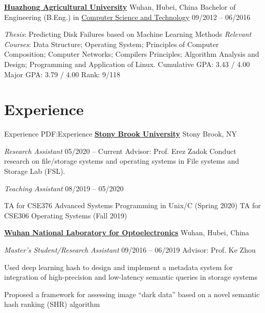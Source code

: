 \documentclass[letterpaper,10pt,oneside]{article}
\begin{document}
\begin{body}
\BigGap
\href{http://www.hzau.edu.cn/en/HOME.htm}
{\textbf{Huazhong Agricultural University}}
\hfill
Wuhan, Hubei, China
\GapNoBreak
\BulletItem
Bachelor of Engineering (B.Eng.) in
\href{http://coi.hzau.edu.cn/}
{Computer Science and Technology}
\hfill
09/2012 -- 06/2016
\begin{detail}

\SubBulletItem
\emph{Thesis}: Predicting Disk Failures based on Machine Learning Methods
\SubBulletItem
\emph{Relevant Courses}: Data Structure; Operating System; Principles of Computer Composition; Computer Networks; Compilers Principles; Algorithm Analysis and Design; Programming and Application of Linux.
\SubBulletItem
Cumulative GPA: 3.43 / 4.00 \quad Major GPA: 3.79 / 4.00 \quad Rank: 9/118
\end{detail}


\section
{Experience}
{Experience}
{PDF:Experience}
\href{https://www.stonybrook.edu/}
{\textbf{Stony Brook University}}
\hfill
Stony Brook, NY

\emph{Research Assistant}
\hfill
05/2020 --
Current
\GapNoBreak
Advisor: Prof. Erez Zadok
\BulletItem
Conduct research on file/storage systems and operating systems in File systems and Storage Lab (FSL).

\BigGap

\emph{Teaching Assistant}
\hfill
08/2019 --
05/2020

\GapNoBreak
\BulletItem
TA for CSE376 Advanced Systems Programming in Unix/C (Spring 2020)
\BulletItem
TA for CSE306 Operating Systems (Fall 2019)


\BigGap
\href{http://english.wnlo.hust.edu.cn/}
{\textbf{Wuhan National Laboratory for Optoelectronics}}
\hfill
Wuhan, Hubei, China

\emph{Master's Student/Research Assistant}
\hfill
09/2016 --
06/2019
\GapNoBreak
Advisor: Prof. Ke Zhou

\GapNoBreak
\BulletItem
Used deep learning hash to design and implement a metadata system for integration of high-precision and low-latency semantic queries in storage systems

\GapNoBreak
\BulletItem
Proposed a framework for assessing image ``dark data'' based on a novel semantic hash ranking (SHR) algorithm


\end{body}
\end{document}
